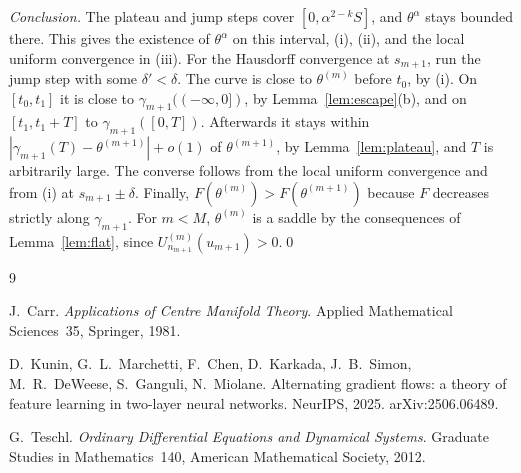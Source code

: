 \documentclass[11pt]{article}
\theoremstyle{definition}
\theoremstyle{remark}
\begin{document}
\emph{Conclusion.} The plateau and jump steps cover $[0,\alpha^{2-k}S]$, and $\theta^\alpha$ stays bounded there. This gives the existence of $\theta^\alpha$ on this interval, (i), (ii), and the local uniform convergence in (iii). For the Hausdorff convergence at $s_{m+1}$, run the jump step with some $\delta'<\delta$. The curve is close to $\theta^{(m)}$ before $t_0$, by (i). On $[t_0,t_1]$ it is close to $\gamma_{m+1}((-\infty,0])$, by Lemma~\ref{lem:escape}(b), and on $[t_1,t_1+T]$ to $\gamma_{m+1}([0,T])$. Afterwards it stays within $|\gamma_{m+1}(T)-\theta^{(m+1)}|+o(1)$ of $\theta^{(m+1)}$, by Lemma~\ref{lem:plateau}, and $T$ is arbitrarily large. The converse follows from the local uniform convergence and from (i) at $s_{m+1}\pm\delta$. Finally, $F(\theta^{(m)})>F(\theta^{(m+1)})$ because $F$ decreases strictly along $\gamma_{m+1}$. For $m<M$, $\theta^{(m)}$ is a saddle by the consequences of Lemma~\ref{lem:flat}, since $U^{(m)}_{n_{m+1}}(u_{m+1})>0$.\qed

\begin{thebibliography}{9}\small

 J.~Carr. \emph{Applications of Centre Manifold Theory}. Applied Mathematical Sciences~35, Springer, 1981.

 D.~Kunin, G.~L.~Marchetti, F.~Chen, D.~Karkada, J.~B.~Simon, M.~R.~DeWeese, S.~Ganguli, N.~Miolane. Alternating gradient flows: a theory of feature learning in two-layer neural networks. NeurIPS, 2025. arXiv:2506.06489.

 G.~Teschl. \emph{Ordinary Differential Equations and Dynamical Systems}. Graduate Studies in Mathematics~140, American Mathematical Society, 2012.

\end{thebibliography}
\end{document}

